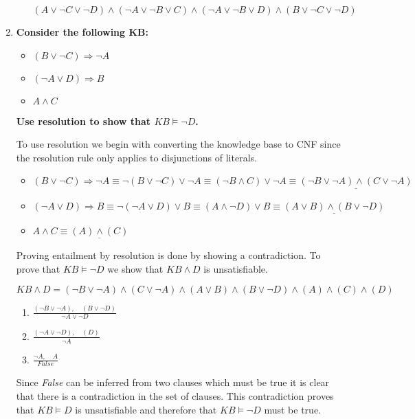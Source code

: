 \begin{enumerate}
\begin{enumerate}
\underline{$(A \lor \neg C \lor \neg D) \land (\neg A \lor \neg B \lor C) \land (\neg A \lor \neg B \lor D) \land (B \lor \neg C \lor \neg D)$}

\end{enumerate}

\item \textbf{Consider the following \acf{KB}:}

\begin{itemize}
\item $(B \lor \neg C) \Rightarrow \neg A$
\item $(\neg A \lor D) \Rightarrow B$
\item $A \land C$
\end{itemize}

\textbf{Use resolution to show that $KB \vDash \neg D$.}

To use resolution we begin with converting the knowledge base to \ac{CNF} since the resolution rule only applies to disjunctions of literals.

\begin{itemize}
\item $(B \lor \neg C) \Rightarrow \neg A \equiv \neg (B \lor \neg C) \lor \neg A \equiv (\neg B \land C) \lor \neg A \equiv \underline{(\neg B \lor \neg A) \land (C \lor \neg A)}$
\item $(\neg A \lor D) \Rightarrow B \equiv \neg (\neg A \lor D) \lor B \equiv (A \land \neg D) \lor B \equiv \underline{(A \lor B) \land (B \lor \neg D)}$
\item $A \land C \equiv \underline{(A) \land (C)}$
\end{itemize}

Proving entailment by resolution is done by showing a contradiction. To prove that $KB \vDash \neg D$ we show that $KB \land D$ is unsatisfiable.

$KB \land D = (\neg B \lor \neg A) \land (C \lor \neg A) \land (A \lor B) \land (B \lor \neg D) \land (A) \land (C) \land (D)$

\begin{enumerate}
\item $\frac{(\neg B \lor \neg A),\quad (B \lor \neg D)}{\neg A \lor \neg D}$
\item $\frac{(\neg A \lor \neg D),\quad (D)}{\neg A}$
\item $\frac{\neg A,\quad A}{\textit{False}}$
\end{enumerate}

Since \textit{False} can be inferred from two clauses which must be true it is clear that there is a contradiction in the set of clauses. This contradiction proves that $KB \vDash D$ is unsatisfiable and therefore that $KB \vDash \neg D$ must be true.


\end{enumerate}
